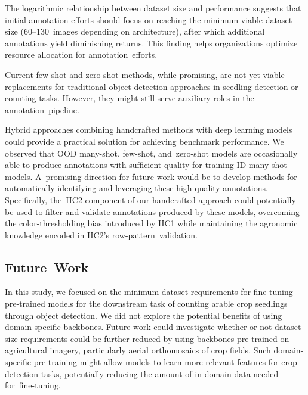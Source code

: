 \documentclass[12pt,a4paper,oneside]{report}
\begin{document}
The logarithmic relationship between dataset size and performance suggests that initial annotation 
efforts should focus on reaching the minimum viable dataset size (\mbox{60--130 images} depending on architecture), 
after which additional annotations yield diminishing returns. This finding helps organizations optimize 
resource allocation for annotation~efforts.


Current few-shot and zero-shot methods, while promising, are not yet viable replacements for traditional 
object detection approaches in seedling detection or counting tasks. However, they might still serve 
auxiliary roles in the annotation~pipeline.

Hybrid approaches combining handcrafted methods with deep learning models could provide a practical solution 
for achieving benchmark performance. We observed that OOD many-shot, few-shot, and~zero-shot models are 
occasionally able to produce annotations with sufficient quality for training ID many-shot models. A~promising 
direction for future work would be to develop methods for automatically identifying and leveraging these 
high-quality annotations. Specifically, the~HC2 component of our handcrafted approach could potentially be used 
to filter and validate annotations produced by these models, overcoming the color-thresholding bias introduced 
by HC1 while maintaining the agronomic knowledge encoded in HC2's row-pattern~validation.

\subsection{Future~Work}
In this study, we focused on the minimum dataset requirements for fine-tuning pre-trained models for the 
downstream task of counting arable crop seedlings through object detection. We did not explore the potential 
benefits of using domain-specific backbones. Future work could investigate whether or not dataset size requirements 
could be further reduced by using backbones pre-trained on agricultural imagery, particularly aerial 
orthomosaics of crop fields. Such domain-specific pre-training might allow models to learn more relevant 
features for crop detection tasks, potentially reducing the amount of in-domain data needed for~fine-tuning.
\end{document}
